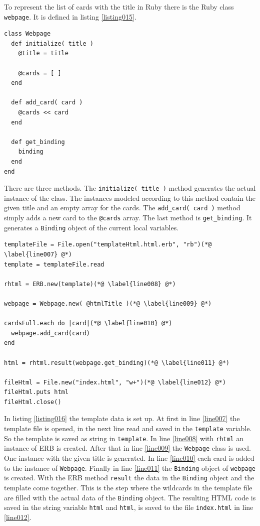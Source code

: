 To represent the list of cards with the title in Ruby there is the Ruby class \texttt{webpage}. It is defined in listing \ref{listing015}.

\begin{lstlisting}[aboveskip=1\baselineskip, caption=Generating HTML without a templating engine., label=listing015]
class Webpage
  def initialize( title )
    @title = title

    @cards = [ ]
  end

  def add_card( card )
    @cards << card
  end

  def get_binding
    binding
  end
end
\end{lstlisting}

There are three methods. The \lstinline{initialize( title )} method generates the actual instance of the class. The instances modeled according to this method contain the given title and an empty array for the cards. The \lstinline{add_card( card )} method simply adds a new card to the \lstinline{@cards} array. The last method is \lstinline{get_binding}. It generates a \lstinline{Binding} object of the current local variables.

\begin{lstlisting}[aboveskip=1\baselineskip, caption=Generating HTML with ERB., label=listing016]
templateFile = File.open("templateHtml.html.erb", "rb")(*@ \label{line007} @*)
template = templateFile.read

rhtml = ERB.new(template)(*@ \label{line008} @*)

webpage = Webpage.new( @htmlTitle )(*@ \label{line009} @*)

cardsFull.each do |card|(*@ \label{line010} @*)
  webpage.add_card(card)
end

html = rhtml.result(webpage.get_binding)(*@ \label{line011} @*)

fileHtml = File.new("index.html", "w+")(*@ \label{line012} @*)
fileHtml.puts html
fileHtml.close()
\end{lstlisting}

In listing \ref{listing016} the template data is set up. At first in line \ref{line007} the template file is opened, in the next line read and saved in the \lstinline{template} variable. So the template is saved as string in \lstinline{template}. In line \ref{line008} with \lstinline{rhtml} an instance of ERB is created. After that in line \ref{line009} the \lstinline{Webpage} class is used. One instance with the given title is generated. In line \ref{line010} each card is added to the instance of \lstinline{Webpage}. Finally in line \ref{line011} the \lstinline{Binding} object of \lstinline{webpage} is created. With the ERB method \lstinline{result} the data in the \lstinline{Binding} object and the template come together. This is the step where the wildcards in the template file are filled with the actual data of the \lstinline{Binding} object. The resulting HTML code is saved in the string variable \lstinline{html} and \lstinline{html}, is saved to the file \texttt{index.html} in line \ref{line012}. 

